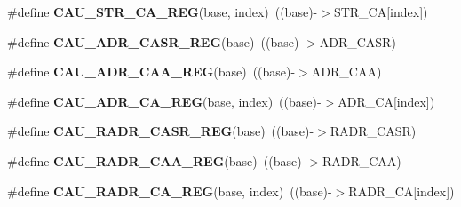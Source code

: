 \begin{DoxyCompactItemize}
\item 
\#define {\bfseries C\+A\+U\+\_\+\+S\+T\+R\+\_\+\+C\+A\+\_\+\+R\+EG}(base,  index)~((base)-\/$>$S\+T\+R\+\_\+\+CA\mbox{[}index\mbox{]})\hypertarget{group__CAU__Register__Accessor__Macros_gac54278fdd16f81e6ea3076e1ccee6a06}{}\label{group__CAU__Register__Accessor__Macros_gac54278fdd16f81e6ea3076e1ccee6a06}

\item 
\#define {\bfseries C\+A\+U\+\_\+\+A\+D\+R\+\_\+\+C\+A\+S\+R\+\_\+\+R\+EG}(base)~((base)-\/$>$A\+D\+R\+\_\+\+C\+A\+SR)\hypertarget{group__CAU__Register__Accessor__Macros_gaca8728a795c07ab4c7cfd4869205d2d8}{}\label{group__CAU__Register__Accessor__Macros_gaca8728a795c07ab4c7cfd4869205d2d8}

\item 
\#define {\bfseries C\+A\+U\+\_\+\+A\+D\+R\+\_\+\+C\+A\+A\+\_\+\+R\+EG}(base)~((base)-\/$>$A\+D\+R\+\_\+\+C\+AA)\hypertarget{group__CAU__Register__Accessor__Macros_ga8e185ad0d7eab25dd0df422fd599d4c2}{}\label{group__CAU__Register__Accessor__Macros_ga8e185ad0d7eab25dd0df422fd599d4c2}

\item 
\#define {\bfseries C\+A\+U\+\_\+\+A\+D\+R\+\_\+\+C\+A\+\_\+\+R\+EG}(base,  index)~((base)-\/$>$A\+D\+R\+\_\+\+CA\mbox{[}index\mbox{]})\hypertarget{group__CAU__Register__Accessor__Macros_ga542aba52278f577bc565922ed1f224b1}{}\label{group__CAU__Register__Accessor__Macros_ga542aba52278f577bc565922ed1f224b1}

\item 
\#define {\bfseries C\+A\+U\+\_\+\+R\+A\+D\+R\+\_\+\+C\+A\+S\+R\+\_\+\+R\+EG}(base)~((base)-\/$>$R\+A\+D\+R\+\_\+\+C\+A\+SR)\hypertarget{group__CAU__Register__Accessor__Macros_ga731266a8fde87bf322beceb4106ef553}{}\label{group__CAU__Register__Accessor__Macros_ga731266a8fde87bf322beceb4106ef553}

\item 
\#define {\bfseries C\+A\+U\+\_\+\+R\+A\+D\+R\+\_\+\+C\+A\+A\+\_\+\+R\+EG}(base)~((base)-\/$>$R\+A\+D\+R\+\_\+\+C\+AA)\hypertarget{group__CAU__Register__Accessor__Macros_gab0ebde83005e4400f15b86691da180e0}{}\label{group__CAU__Register__Accessor__Macros_gab0ebde83005e4400f15b86691da180e0}

\item 
\#define {\bfseries C\+A\+U\+\_\+\+R\+A\+D\+R\+\_\+\+C\+A\+\_\+\+R\+EG}(base,  index)~((base)-\/$>$R\+A\+D\+R\+\_\+\+CA\mbox{[}index\mbox{]})\hypertarget{group__CAU__Register__Accessor__Macros_ga7ebb38f65122d7fa40dde22ddf11d140}{}\label{group__CAU__Register__Accessor__Macros_ga7ebb38f65122d7fa40dde22ddf11d140}


\end{DoxyCompactItemize}
